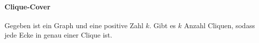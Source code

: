 \paragraph{Clique-Cover} Gegeben ist ein Graph und eine positive Zahl \(k\). Gibt es \(k\) Anzahl Cliquen, sodass jede Ecke in genau einer Clique ist.\\
\begin{comment}
\begin{tikzpicture}
    \node[draw, circle] (1) {1};
    \node[draw, circle] (7) [below left = of 1]{7};
    \node[draw, circle] (5) [below right = of 7] {5};
    \node[draw, circle] (4) [below right = of 1] {4};
    \draw [very thick, color=blue] (1) -- (7);
    \draw [very thick, color=blue] (1) -- (4);
    \draw [very thick, color=blue] (1) -- (5);
    \draw [very thick, color=blue] (4) -- (7);
    \draw [very thick, color=blue] (4) -- (5);
    \draw [very thick, color=blue] (5) -- (7);
    \node [draw, circle] (8) [below right = of 4] {8};
    \node [draw, circle] (2) [below right = of 8] {2};
    \node [draw, circle] (3) [below left = of 8] {3};
    \node [draw, circle] (6) [below right= of 3] {6};
    \draw [very thick, color=blue] (3) -- (2);
    \draw [very thick, color=blue] (3) -- (6);
    \draw [very thick, color=blue] (3) -- (8);
    \draw [very thick, color=blue] (2) -- (6);
    \draw [very thick, color=blue] (2) -- (8);
    \draw [very thick, color=blue] (6) -- (8);
\end{tikzpicture}\\
\end{comment}
